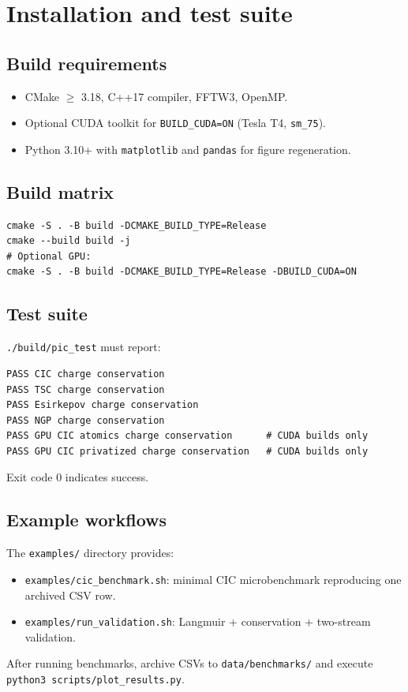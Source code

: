 \section{Installation and test suite}
\label{sec:install}

\subsection{Build requirements}
\begin{itemize}
    \item CMake $\geq$ 3.18, C++17 compiler, FFTW3, OpenMP.
    \item Optional CUDA toolkit for \texttt{BUILD\_CUDA=ON} (Tesla T4, \texttt{sm\_75}).
    \item Python 3.10+ with \texttt{matplotlib} and \texttt{pandas} for figure regeneration.
\end{itemize}

\subsection{Build matrix}
\begin{verbatim}
cmake -S . -B build -DCMAKE_BUILD_TYPE=Release
cmake --build build -j
# Optional GPU:
cmake -S . -B build -DCMAKE_BUILD_TYPE=Release -DBUILD_CUDA=ON
\end{verbatim}

\subsection{Test suite}
\texttt{./build/pic\_test} must report:
\begin{verbatim}
PASS CIC charge conservation
PASS TSC charge conservation
PASS Esirkepov charge conservation
PASS NGP charge conservation
PASS GPU CIC atomics charge conservation      # CUDA builds only
PASS GPU CIC privatized charge conservation   # CUDA builds only
\end{verbatim}
Exit code 0 indicates success.

\subsection{Example workflows}
The \texttt{examples/} directory provides:
\begin{itemize}
    \item \texttt{examples/cic\_benchmark.sh}: minimal CIC microbenchmark reproducing one archived CSV row.
    \item \texttt{examples/run\_validation.sh}: Langmuir + conservation + two-stream validation.
\end{itemize}
After running benchmarks, archive CSVs to \texttt{data/benchmarks/} and execute \texttt{python3 scripts/plot\_results.py}.
